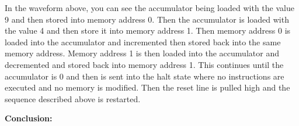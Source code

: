\documentclass{article}         %
\begin{document}
In the waveform above, you can see the accumulator being loaded with the value 9 and then stored into memory address 0. Then the accumulator is loaded with the value 4 and then store it into memory address 1. Then memory address 0 is loaded into the accumulator and incremented then stored back into the same memory address. Memory address 1 is then loaded into the accumulator and decremented and stored back into memory address 1. This continues until the accumulator is 0 and then is sent into the halt state where no instructions are executed and no memory is modified. Then the reset line is pulled high and the sequence described above is restarted.\\

\newpage

\textbf{Conclusion:} 
\end{document}
